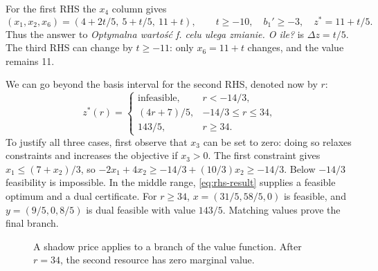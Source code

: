 \documentclass[11pt,a4paper]{article}
\begin{document}
For the first RHS the $x_4$ column gives
\[
  (x_1,x_2,x_6)=(4+2t/5,\ 5+t/5,\ 11+t),\qquad
  t\geq-10,\quad b_1'\geq-3,\quad z^*=11+t/5.
\]
Thus the answer to \emph{Optymalna wartość f. celu ulega zmianie. O ile?}
is $\Delta z=t/5$. The third RHS can change by $t\geq-11$:
only $x_6=11+t$ changes, and the value remains 11.

We can go beyond the basis interval for the second RHS, denoted now by $r$:
\begin{equation}\label{eq:value-function}
  z^*(r)=
  \begin{cases}
    \text{infeasible}, & r<-14/3,           \\
    (4r+7)/5,          & -14/3\leq r\leq34, \\
    143/5,             & r\geq34.
  \end{cases}
\end{equation}
To justify all three cases, first observe that $x_3$ can be set to zero:
doing so relaxes constraints and increases the objective if $x_3>0$.
The first constraint gives $x_1\leq(7+x_2)/3$, so
$-2x_1+4x_2\geq-14/3+(10/3)x_2\geq-14/3$.
Below $-14/3$ feasibility is impossible. In the middle range,
\eqref{eq:rhs-result} supplies a feasible optimum and a dual certificate.
For $r\geq34$, $x=(31/5,58/5,0)$ is feasible, and
$y=(9/5,0,8/5)$ is dual feasible with value $143/5$.
Matching values prove the final branch.

\begin{figure}[H]\centering
  \caption{A shadow price applies to a branch of the value function.
    After $r=34$, the second resource has zero marginal value.}
\end{figure}
\end{document}
